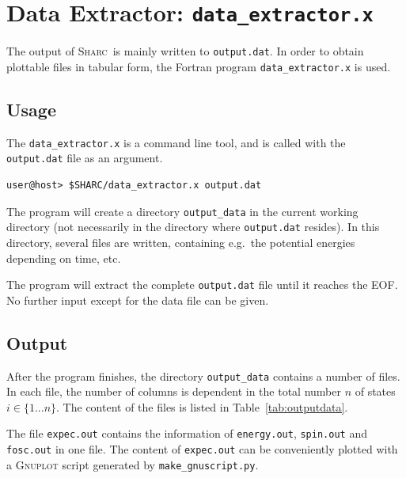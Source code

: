\documentclass[a4paper,11pt,DIV=15,openany,twoside=false]{scrbook}
\newcommand{\sharc}{\textsc{Sharc}}
\newcommand{\ttt}[1]{\texttt{#1}}
\begin{document}
\section{Data Extractor: \ttt{data\_extractor.x}}\label{sec:data_extractor.x}

The output of \sharc\ is mainly written to \ttt{output.dat}. In order to obtain plottable files in tabular form, the Fortran program \ttt{data\_extractor.x} is used.

\subsection{Usage}

The \ttt{data\_extractor.x} is a command line tool, and is called with the \ttt{output.dat} file as an argument.
\begin{verbatim}
user@host> $SHARC/data_extractor.x output.dat
\end{verbatim}
The program will create a directory \ttt{output\_data} in the current working directory (not necessarily in the directory where \ttt{output.dat} resides). In this directory, several files are written, containing e.g.\ the potential energies depending on time, etc.

The program will extract the complete \ttt{output.dat} file until it reaches the EOF. No further input except for the data file can be given.

\subsection{Output}

After the program finishes, the directory \ttt{output\_data} contains a number of files. In each file, the number of columns is dependent in the total number $n$ of states $i\in\{1...n\}$. The content of the files is listed in Table~\ref{tab:outputdata}.

The file \ttt{expec.out} contains the information of \ttt{energy.out}, \ttt{spin.out} and \ttt{fosc.out} in one file. The content of \ttt{expec.out} can be conveniently plotted with a \textsc{Gnuplot} script generated by \ttt{make\_gnuscript.py}.
\end{document}

